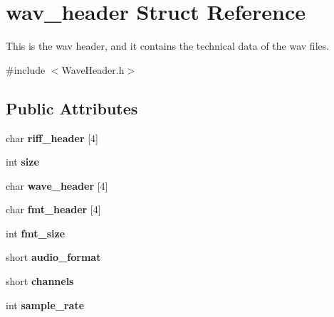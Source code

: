 \hypertarget{structwav__header}{}\section{wav\+\_\+header Struct Reference}
\label{structwav__header}


This is the wav header, and it contains the technical data of the wav files.  




{\ttfamily \#include $<$Wave\+Header.\+h$>$}

\subsection*{Public Attributes}
\begin{DoxyCompactItemize}
\item 
\mbox{\label{structwav__header_a977b8193bf1f39dbd815c6210f0bb6c6}} 
char {\bfseries riff\+\_\+header} \mbox{[}4\mbox{]}
\item 
\mbox{\label{structwav__header_a3d8d145f19783d500852e93ea5f292d8}} 
int {\bfseries size}
\item 
\mbox{\label{structwav__header_a0dc0cff34ad7fe5e59c5cbcee1640354}} 
char {\bfseries wave\+\_\+header} \mbox{[}4\mbox{]}
\item 
\mbox{\label{structwav__header_a4039d1e8e91d7940aa45a29aad27b4ce}} 
char {\bfseries fmt\+\_\+header} \mbox{[}4\mbox{]}
\item 
\mbox{\label{structwav__header_a92e6134a93f1c2c7d8084fadc7645823}} 
int {\bfseries fmt\+\_\+size}
\item 
\mbox{\label{structwav__header_a94c9ee0387f846c47eb9e97636994d93}} 
short {\bfseries audio\+\_\+format}
\item 
\mbox{\label{structwav__header_a201fbf3b7d39ef8b49b20ace40f82d56}} 
short {\bfseries channels}
\item 
\mbox{\label{structwav__header_a0632019c676aa88f0351c0ab11461de0}} 
int {\bfseries sample\+\_\+rate}
\item 

\end{DoxyCompactItemize}
